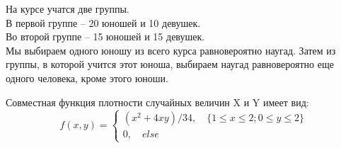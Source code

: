 \documentclass[addpoints, answers]{exam} %
\begin{document}
\begin{questions}
\question	На курсе учатся две группы.\\
В первой группе – 20 юношей и 10 девушек.\\
Во второй группе – 15 юношей и 15 девушек.\\
Мы выбираем одного юношу из всего курса равновероятно наугад. Затем из группы, в которой учится этот юноша, выбираем наугад равновероятно еще одного человека, кроме этого юноши.

	\question Совместная функция плотности случайных величин X и Y имеет вид:\\
	\[
	f(x,y)=
	\begin{cases}
	(x^2+4xy)/34, \quad \{1 \leqslant x \leqslant2; 0 \leqslant y \leqslant 2\}\\
	0, \quad else
	\end{cases}
	\]
\end{questions}
\end{document}
